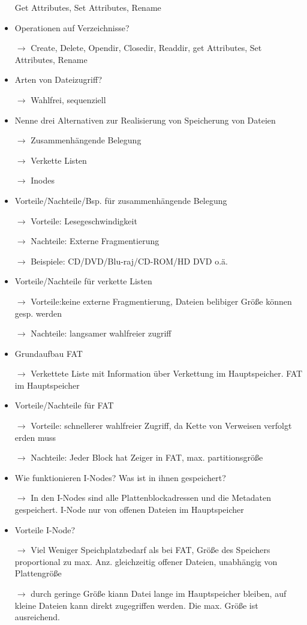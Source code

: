 \documentclass[10pt,a4paper]{article}
\begin{document}
\begin{itemize}
Get Attributes, Set Attributes, Rename
\item Operationen auf Verzeichnisse?
\item[$\rightarrow$] Create, Delete, Opendir, Closedir, Readdir, get Attributes, Set Attributes, Rename
\item Arten von Dateizugriff?
\item[$\rightarrow$] Wahlfrei, sequenziell
\item Nenne drei Alternativen zur Realisierung von Speicherung von Dateien
\item[$\rightarrow$] Zusammenhängende Belegung
\item[$\rightarrow$] Verkette Listen
\item[$\rightarrow$] Inodes
\item Vorteile/Nachteile/Bsp. für zusammenhängende Belegung
\item[$\rightarrow$] Vorteile: Lesegeschwindigkeit
\item[$\rightarrow$] Nachteile: Externe Fragmentierung
\item[$\rightarrow$] Beispiele: CD/DVD/Blu-raj/CD-ROM/HD DVD o.ä.
\item Vorteile/Nachteile für verkette Listen
\item[$\rightarrow$] Vorteile:keine externe Fragmentierung, Dateien belibiger Größe können gesp. werden
\item[$\rightarrow$] Nachteile: langsamer wahlfreier zugriff
\item Grundaufbau FAT
\item[$\rightarrow$] Verkettete Liste mit Information über Verkettung im Hauptspeicher. FAT im Hauptspeicher
\item Vorteile/Nachteile für FAT
\item[$\rightarrow$] Vorteile: schnellerer wahlfreier Zugriff, da Kette von Verweisen verfolgt erden muss
\item[$\rightarrow$] Nachteile: Jeder Block hat Zeiger in FAT, max. partitionsgröße
\item Wie funktionieren I-Nodes? Was ist in ihnen gespeichert?
\item[$\rightarrow$]In den I-Nodes sind alle Plattenblockadressen und die Metadaten gespeichert. I-Node nur von offenen Dateien im Hauptspeicher
\item Vorteile I-Node?
\item[$\rightarrow$]Viel Weniger Speichplatzbedarf als bei FAT, Größe des Speichers proportional zu max. Anz. gleichzeitig offener Dateien, unabhängig von Plattengröße
\item[$\rightarrow$]durch geringe Größe kiann Datei lange im Hauptspeicher bleiben, auf kleine Dateien kann direkt zugegriffen werden. Die max. Größe ist ausreichend.

\end{itemize}
\end{document}
